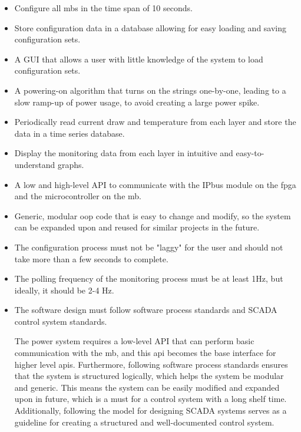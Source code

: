 \documentclass[main.tex]{subfiles}
\begin{document}
\begin{itemize}
    \item Configure all \gls{mb}s in the time span of 10 seconds. 
    \item Store configuration data in a database allowing for easy loading and saving configuration sets.
    \item A GUI that allows a user with little knowledge of the system to load configuration sets.
    \item A powering-on algorithm that turns on the strings one-by-one, leading to a slow ramp-up of power usage, to avoid creating a large power spike.
    \item Periodically read current draw and temperature from each layer and store the data in a time series database.
    \item Display the monitoring data from each layer in intuitive and easy-to-understand graphs.
    \item A low and high-level API to communicate with the IPbus module on the \gls{fpga} and the microcontroller on the \gls{mb}.
    \item Generic, modular \acrlong{oop} code that is easy to change and modify, so the system can be expanded upon and reused for similar projects in the future.
    \item The configuration process must not be "laggy" for the user and should not take more than a few seconds to complete.
    \item  The polling frequency of the monitoring process must be at least 1Hz, but ideally, it should be 2-4 Hz.
    \item The software design must follow software process standards and SCADA control system standards.
    
The power system requires a low-level API that can perform basic communication with the \gls{mb}, and this \gls{api} becomes the base interface for higher level \gls{api}s. Furthermore, following software process standards ensures that the system is structured logically, which helps the system be modular and generic. This means the system can be easily modified and expanded upon in future, which is a must for a control system with a long shelf time. Additionally, following the model for designing SCADA systems serves as a guideline for creating a structured and well-documented control system.
    
    
\end{itemize}

\newpage
\end{document}
